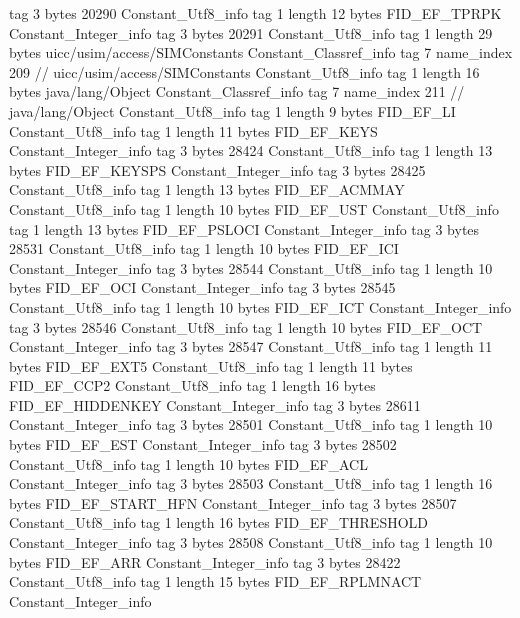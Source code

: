{{{			tag	3
			bytes	20290
		}
		Constant_Utf8_info {
			tag	1
			length	12
			bytes	FID_EF_TPRPK
		}
		Constant_Integer_info {
			tag	3
			bytes	20291
		}
		Constant_Utf8_info {
			tag	1
			length	29
			bytes	uicc/usim/access/SIMConstants
		}
		Constant_Classref_info {
			tag	7
			name_index	209		// uicc/usim/access/SIMConstants
		}
		Constant_Utf8_info {
			tag	1
			length	16
			bytes	java/lang/Object
		}
		Constant_Classref_info {
			tag	7
			name_index	211		// java/lang/Object
		}
		Constant_Utf8_info {
			tag	1
			length	9
			bytes	FID_EF_LI
		}
		Constant_Utf8_info {
			tag	1
			length	11
			bytes	FID_EF_KEYS
		}
		Constant_Integer_info {
			tag	3
			bytes	28424
		}
		Constant_Utf8_info {
			tag	1
			length	13
			bytes	FID_EF_KEYSPS
		}
		Constant_Integer_info {
			tag	3
			bytes	28425
		}
		Constant_Utf8_info {
			tag	1
			length	13
			bytes	FID_EF_ACMMAY
		}
		Constant_Utf8_info {
			tag	1
			length	10
			bytes	FID_EF_UST
		}
		Constant_Utf8_info {
			tag	1
			length	13
			bytes	FID_EF_PSLOCI
		}
		Constant_Integer_info {
			tag	3
			bytes	28531
		}
		Constant_Utf8_info {
			tag	1
			length	10
			bytes	FID_EF_ICI
		}
		Constant_Integer_info {
			tag	3
			bytes	28544
		}
		Constant_Utf8_info {
			tag	1
			length	10
			bytes	FID_EF_OCI
		}
		Constant_Integer_info {
			tag	3
			bytes	28545
		}
		Constant_Utf8_info {
			tag	1
			length	10
			bytes	FID_EF_ICT
		}
		Constant_Integer_info {
			tag	3
			bytes	28546
		}
		Constant_Utf8_info {
			tag	1
			length	10
			bytes	FID_EF_OCT
		}
		Constant_Integer_info {
			tag	3
			bytes	28547
		}
		Constant_Utf8_info {
			tag	1
			length	11
			bytes	FID_EF_EXT5
		}
		Constant_Utf8_info {
			tag	1
			length	11
			bytes	FID_EF_CCP2
		}
		Constant_Utf8_info {
			tag	1
			length	16
			bytes	FID_EF_HIDDENKEY
		}
		Constant_Integer_info {
			tag	3
			bytes	28611
		}
		Constant_Integer_info {
			tag	3
			bytes	28501
		}
		Constant_Utf8_info {
			tag	1
			length	10
			bytes	FID_EF_EST
		}
		Constant_Integer_info {
			tag	3
			bytes	28502
		}
		Constant_Utf8_info {
			tag	1
			length	10
			bytes	FID_EF_ACL
		}
		Constant_Integer_info {
			tag	3
			bytes	28503
		}
		Constant_Utf8_info {
			tag	1
			length	16
			bytes	FID_EF_START_HFN
		}
		Constant_Integer_info {
			tag	3
			bytes	28507
		}
		Constant_Utf8_info {
			tag	1
			length	16
			bytes	FID_EF_THRESHOLD
		}
		Constant_Integer_info {
			tag	3
			bytes	28508
		}
		Constant_Utf8_info {
			tag	1
			length	10
			bytes	FID_EF_ARR
		}
		Constant_Integer_info {
			tag	3
			bytes	28422
		}
		Constant_Utf8_info {
			tag	1
			length	15
			bytes	FID_EF_RPLMNACT
		}
		Constant_Integer_info {
}}}
